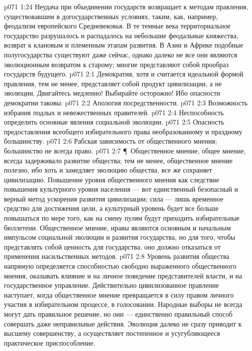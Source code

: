 \vs p071 1:24 Неудача при объединении государств возвращает к методам правления, существовавшим в догосударственных условиях, таким, как, например, феодализм европейского Средневековья. В те темные века территориальное государство разрушалось и распадалось на небольшие феодальные княжества, возврат к клановым и племенным этапам развития. В Азии и Африке подобные полугосударства существуют даже сейчас, однако далеко не все они являются эволюционным возвратом к старому; многие представляют собой прообраз государств будущего.
\vs p071 2:1 Демократия, хотя и считается идеальной формой правления, тем не менее, представляет собой продукт цивилизации, а не эволюции. Двигайтесь медленно! Выбирайте осторожно! Ибо опасности демократии таковы:
\vs p071 2:2 \bibnobreakspace Апология посредственности.
\vs p071 2:3 \bibnobreakspace Возможность избрания подлых и невежественных правителей.
\vs p071 2:4 \bibnobreakspace Неспособность определить основные явления социальной эволюции.
\vs p071 2:5 \bibnobreakspace Опасность предоставления всеобщего избирательного права необразованному и праздному большинству.
\vs p071 2:6 \bibnobreakspace Рабская зависимость от общественного мнения; большинство не всегда право.
\vs p071 2:7 \P\ Общественное мнение, общее мнение, всегда задерживало развитие общества; тем не менее, общественное мнение полезно, ибо хоть и замедляет эволюцию общества, все же сохраняет цивилизацию. Повышение уровня общественного мнения как следствие повышения культурного уровня населения --- вот единственный безопасный и верный метод ускорения развития цивилизации; сила --- лишь временное средство для достижения цели, а культурный уровень будет все больше повышаться по мере того, как на смену пулям будут приходить избирательные бюллетени. Общественное мнение, нравы являются основным и начальным импульсом социальной эволюции и развития государства, но для того, чтобы представлять собой ценность для государства, оно должно отказаться от применения насильственных методов.
\vs p071 2:8 Уровень развития общества напрямую определяется способностью свободно выраженного общественного мнения, оказывать влияние и на личное поведение представителей власти, и на государственное управление. Действительно цивилизованное правление наступает, когда общественное мнение превращается в силу правом личного участия в избирательном процессе, в голосовании. Народные выборы не всегда могут дать правильное решение, но они --- единственно правильный способ совершать даже неправильные действия. Эволюция далеко не сразу приводит к высшему совершенству, а осуществляет постепенное и усугубляющееся практическое приспособление.
